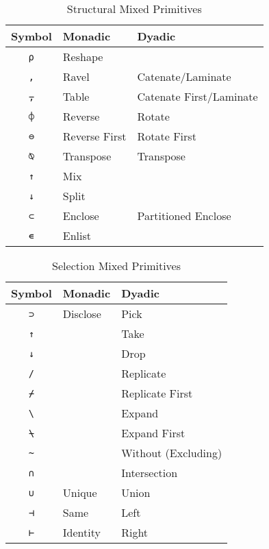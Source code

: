 \documentclass[numbers,preprint]{sigplanconf}
\begin{document}
\begin{table}
\centering
\begin{tabular}{cll}
\toprule
Symbol     & Monadic       & Dyadic \\
\midrule
\texttt{⍴} & Reshape       & \\
\texttt{,} & Ravel         & Catenate/Laminate \\
\texttt{⍪} & Table         & Catenate First/Laminate \\
\texttt{⌽} & Reverse       & Rotate \\
\texttt{⊖} & Reverse First & Rotate First \\
\texttt{⍉} & Transpose     & Transpose \\
\texttt{↑} & Mix           & \\
\texttt{↓} & Split         & \\
\texttt{⊂} & Enclose       & Partitioned Enclose \\
\texttt{∊} & Enlist        & \\
\end{tabular}
\caption{Structural Mixed Primitives}
\label{tab:structprims}
\end{table}

\begin{table}
\centering
\begin{tabular}{cll}
\toprule
Symbol                   & Monadic  & Dyadic \\
\midrule
\texttt{⊃}               & Disclose & Pick\\
\texttt{↑}               &          & Take \\
\texttt{↓}               &          & Drop \\
\texttt{/}               &          & Replicate \\
\texttt{⌿}               &          & Replicate First \\
\texttt{\textbackslash}  &          & Expand \\
\texttt{⍀}               &          & Expand First \\
\texttt{\textasciitilde} &          & Without (Excluding) \\
\texttt{∩}               &          & Intersection \\
\texttt{∪}               & Unique   & Union \\
\texttt{⊣}               & Same     & Left \\
\texttt{⊢}               & Identity & Right\\
\end{tabular}
\caption{Selection Mixed Primitives}
\label{tab:selprims}
\end{table}
\end{document}
